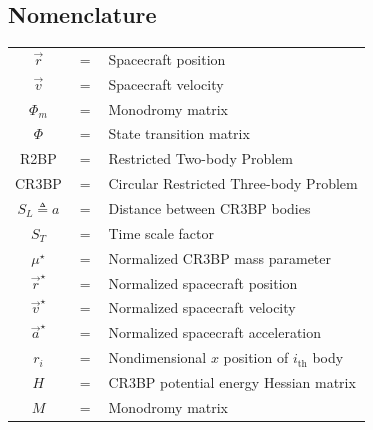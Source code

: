 \documentclass[conf]{new-aiaa}
\begin{document}
\begin{multicols*}{2}

\tableofcontents

\section{Nomenclature}
\begin{flushleft}
\begin{tabularx}{\columnwidth}{ccl}
    $\overrightarrow{r}$ & $=$ & Spacecraft position \\
    $\overrightarrow{v}$ & $=$ & Spacecraft velocity \\
    $\Phi_m$             & $=$ & Monodromy matrix \\
    $\Phi$               & $=$ & State transition matrix \\
    R2BP                 & $=$ & Restricted Two-body Problem \\
    CR3BP                & $=$ & Circular Restricted Three-body Problem \\
    $S_L \triangleq a$   & $=$ & Distance between CR3BP bodies \\
    $S_T$                & $=$ & Time scale factor \\
    $\mu^\star$          & $=$ & Normalized CR3BP mass parameter \\
    $\overrightarrow{r}^\star$ & $=$ & Normalized spacecraft position \\
    $\overrightarrow{v}^\star$ & $=$ & Normalized spacecraft velocity \\
    $\overrightarrow{a}^\star$ & $=$ & Normalized spacecraft acceleration \\
    $r_i$                & $=$ & Nondimensional $x$ position of $i_{\text{th}}$ body \\ 
    $H$                  & $=$ & CR3BP potential energy Hessian matrix\\ 
    $M$                  & $=$ & Monodromy matrix\\     
\end{tabularx}
\end{flushleft}


\end{multicols*}
\end{document}
